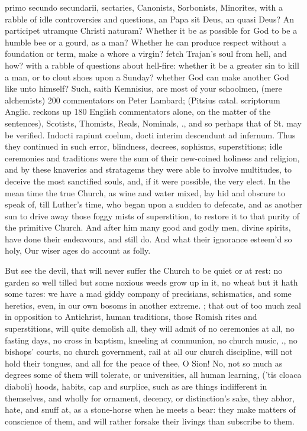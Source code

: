 {primo secundo secundarii, sectaries, Canonists, Sorbonists, Minorites,
with a rabble of idle controversies and questions, an Papa sit
Deus, an quasi Deus? An participet utramque Christi naturam? Whether it
be as possible for God to be a humble bee or a gourd, as a man? Whether
he can produce respect without a foundation or term, make a whore a
virgin? fetch Trajan's soul from hell, and how? with a rabble of
questions about hell-fire: whether it be a greater sin to kill a man,
or to clout shoes upon a Sunday? whether God can make another God like
unto himself? Such, saith Kemnisius, are most of your schoolmen, (mere
alchemists) 200 commentators on Peter Lambard; (Pitsius catal.
scriptorum Anglic. reckons up 180 English commentators alone, on the
matter of the sentences), Scotists, Thomists, Reals, Nominals, \etc{}., and
so perhaps that of St. \Austin{} may be verified. Indocti rapiunt
coelum, docti interim descendunt ad infernum. Thus they continued in
such error, blindness, decrees, sophisms, superstitions; idle
ceremonies and traditions were the sum of their new-coined holiness and
religion, and by these knaveries and stratagems they were able to
involve multitudes, to deceive the most sanctified souls, and, if it
were possible, the very elect. In the mean time the true Church, as
wine and water mixed, lay hid and obscure to speak of, till Luther's
time, who began upon a sudden to defecate, and as another sun to drive
away those foggy mists of superstition, to restore it to that purity of
the primitive Church. And after him many good and godly men, divine
spirits, have done their endeavours, and still do.
And what their ignorance esteem'd so holy,
Our wiser ages do account as folly.

But see the devil, that will never suffer the Church to be quiet or at
rest: no garden so well tilled but some noxious weeds grow up in it, no
wheat but it hath some tares: we have a mad giddy company of
precisians, schismatics, and some heretics, even, in our own bosoms in
another extreme. ;
that out of too much zeal in opposition to Antichrist, human
traditions, those Romish rites and superstitions, will quite demolish
all, they will admit of no ceremonies at all, no fasting days, no cross
in baptism, kneeling at communion, no church music, \etc{}., no bishops'
courts, no church government, rail at all our church discipline, will
not hold their tongues, and all for the peace of thee, O Sion! No, not
so much as degrees some of them will tolerate, or universities, all
human learning, ('tis cloaca diaboli) hoods, habits, cap and surplice,
such as are things indifferent in themselves, and wholly for ornament,
decency, or distinction's sake, they abhor, hate, and snuff at, as a
stone-horse when he meets a bear: they make matters of conscience of
them, and will rather forsake their livings than subscribe to them.

}

